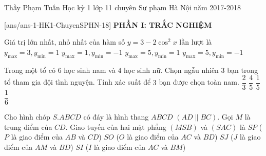 \fontsize{12pt}{16pt}\selectfont
\begin{name}
{Thầy Phạm Tuấn }
{Học kỳ 1 lớp 11 chuyên Sư phạm Hà Nội năm 2017-2018}
\end{name}

[ans/ans-1-HK1-ChuyenSPHN-18]
\setcounter{ex}{0} \setcounter{bt}{0}
\noindent
\textbf{PHẦN I: TRẮC NGHIỆM}
\begin{ex}%
Giá trị lớn nhất, nhỏ nhất của hàm số $y=3-2\cos^2x$ lần lượt là
\choice
{\True $y_{\max} = 3, y_{\min} = 1$}
{$y_{\max} = 1, y_{\min} = -1$}
{$y_{\max} = 5, y_{\min} = 1$}
{$y_{\max} = 5, y_{\min} = -1$}
\end{ex}

\begin{ex}%
Trong một tổ có $6$ học sinh nam và $4$ học sinh nữ. Chọn ngẫu nhiên $3$ bạn trong tổ  tham gia đội tình nguyện. Tính xác suất để $3$ bạn được chọn toàn nam. 
\choice
{$\dfrac{2}{3}$}
{$\dfrac{4}{5}$}
{$\dfrac{1}{5}$}
{\True $\dfrac{1}{6}$}
\end{ex}

\begin{ex}%
Cho hình chóp $S.ABCD$ có đáy là hình thang $ABCD$ $(AD \parallel BC)$. Gọi $M$ là trung điểm của $CD$. Giao tuyến của hai mặt phẳng $(MSB)$ và $(SAC)$ là 
\choice
{$SP$ ($P$ là giao điểm của $AB$ và $CD$)}
{$SO$ ($O$ là giao điểm của $AC$ và $BD$)}
{$SJ$ ($J$ là giao điểm của $AM$ và $BD$)}
{\True $SI$ ($I$ là giao điểm của $AC$ và $BM$)}
\end{ex}

